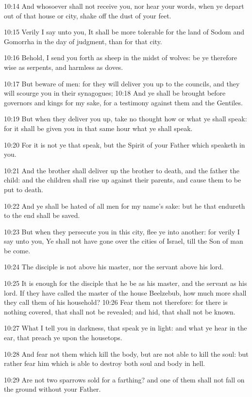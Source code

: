 10:14 And whosoever shall not receive you, nor hear your words, when ye depart out of that house or city, shake off the dust of your feet.

10:15 Verily I say unto you, It shall be more tolerable for the land of Sodom and Gomorrha in the day of judgment, than for that city.

10:16 Behold, I send you forth as sheep in the midst of wolves: be ye therefore wise as serpents, and harmless as doves.

10:17 But beware of men: for they will deliver you up to the councils, and they will scourge you in their synagogues; 10:18 And ye shall be brought before governors and kings for my sake, for a testimony against them and the Gentiles.

10:19 But when they deliver you up, take no thought how or what ye shall speak: for it shall be given you in that same hour what ye shall speak.

10:20 For it is not ye that speak, but the Spirit of your Father which speaketh in you.

10:21 And the brother shall deliver up the brother to death, and the father the child: and the children shall rise up against their parents, and cause them to be put to death.

10:22 And ye shall be hated of all men for my name's sake: but he that endureth to the end shall be saved.

10:23 But when they persecute you in this city, flee ye into another: for verily I say unto you, Ye shall not have gone over the cities of Israel, till the Son of man be come.

10:24 The disciple is not above his master, nor the servant above his lord.

10:25 It is enough for the disciple that he be as his master, and the servant as his lord. If they have called the master of the house Beelzebub, how much more shall they call them of his household?  10:26 Fear them not therefore: for there is nothing covered, that shall not be revealed; and hid, that shall not be known.

10:27 What I tell you in darkness, that speak ye in light: and what ye hear in the ear, that preach ye upon the housetops.

10:28 And fear not them which kill the body, but are not able to kill the soul: but rather fear him which is able to destroy both soul and body in hell.

10:29 Are not two sparrows sold for a farthing? and one of them shall not fall on the ground without your Father.

